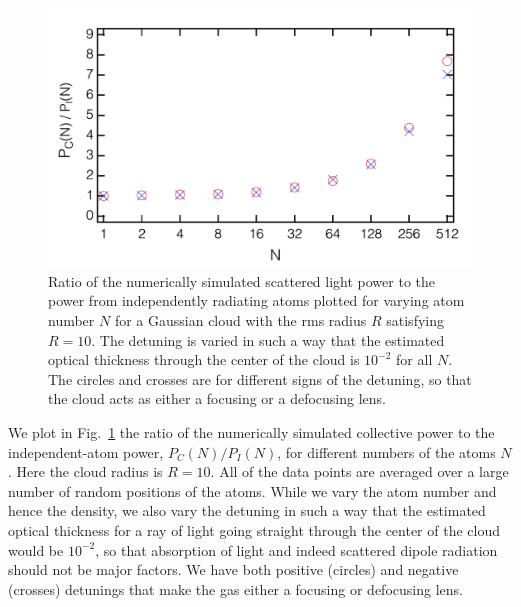 \begin{figure}[h!]
\begin{center}
\includegraphics[width=\textwidth]{Pc_Pi.pdf}
\end{center}
\caption{Ratio of the numerically simulated scattered light power to the power from independently radiating atoms plotted for varying atom number $N$ for a Gaussian cloud with the rms radius $R$ satisfying $R=10$. The detuning is varied in such a way that the estimated optical thickness through the center of the cloud is $10^{-2}$ for all $N$. The circles and crosses are for different signs of the detuning, so that the cloud acts as either a focusing or a defocusing lens.}
\label{PCANDPN}
\end{figure}



We plot in Fig.~\ref{PCANDPN} the ratio of the numerically simulated collective power to the independent-atom power, $P_C(N)/P_I(N)$, for different numbers of the atoms $N$. Here the cloud radius is $R=10$. All of the data points are averaged over a large number of random positions of the atoms. While we vary the atom number and hence the density, we also vary the detuning in such a way that the estimated optical thickness for a ray of light going straight through the center of the cloud would be $10^{-2}$, so that absorption of light and indeed scattered dipole radiation should not be major factors. We have both positive (circles) and negative (crosses) detunings that make the gas either a focusing or defocusing lens.

